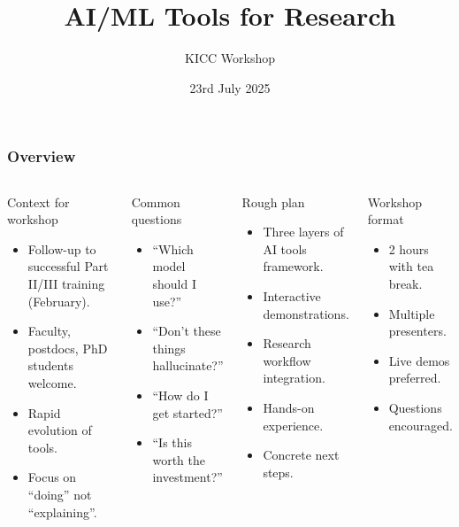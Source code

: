 \documentclass[aspectratio=169]{beamer}
\title{AI/ML Tools for Research}
\subtitle{KICC Workshop}
\date{23rd July 2025}
\begin{document}
\begin{frame}
    \titlepage
\end{frame}

\begin{frame}
    \frametitle{Overview}
    \begin{columns}
        \begin{block}{Context for workshop}
            \begin{itemize}
                \item Follow-up to successful Part II/III training (February).
                \item Faculty, postdocs, PhD students welcome.
                \item Rapid evolution of tools.
                \item Focus on ``doing'' not ``explaining''.
            \end{itemize}
        \end{block}
        
        \begin{block}{Common questions}
            \begin{itemize}
                \item ``Which model should I use?''
                \item ``Don't these things hallucinate?''
                \item ``How do I get started?''
                \item ``Is this worth the investment?''
            \end{itemize}
        \end{block}
        
        \begin{block}{Rough plan}
            \begin{itemize}
                \item Three layers of AI tools framework.
                \item Interactive demonstrations.
                \item Research workflow integration.
                \item Hands-on experience.
                \item Concrete next steps.
            \end{itemize}
        \end{block}
        
        \begin{block}{Workshop format}
            \begin{itemize}
                \item 2 hours with tea break.
                \item Multiple presenters.
                \item Live demos preferred.
                \item Questions encouraged.
            \end{itemize}
        \end{block}
    \end{columns}
\end{frame}
\end{document}
